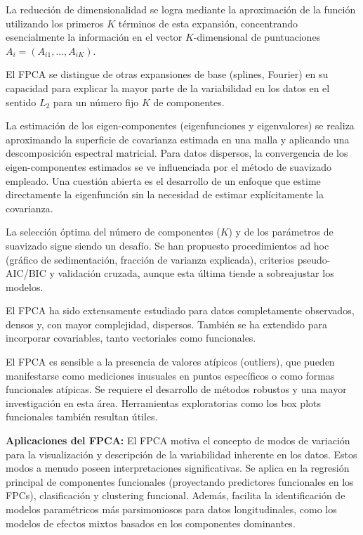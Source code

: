 \documentclass{article}
\begin{document}
\vspace{0.35cm}\noindent
La reducción de dimensionalidad se logra mediante la aproximación de la función utilizando los primeros $K$ términos de esta expansión, concentrando esencialmente la información en el vector $K$-dimensional de puntuaciones $A_i = (A_{i1}, ..., A_{iK})$.

\vspace{0.35cm}\noindent
El FPCA se distingue de otras expansiones de base (splines, Fourier) en su capacidad para explicar la mayor parte de la variabilidad en los datos en el sentido $L_2$ para un número fijo $K$ de componentes.

\vspace{0.35cm}\noindent
La estimación de los eigen-componentes (eigenfunciones y eigenvalores) se realiza aproximando la superficie de covarianza estimada en una malla y aplicando una descomposición espectral matricial. Para datos dispersos, la convergencia de los eigen-componentes estimados se ve influenciada por el método de suavizado empleado. Una cuestión abierta es el desarrollo de un enfoque que estime directamente la eigenfunción sin la necesidad de estimar explícitamente la covarianza.

\vspace{0.35cm}\noindent
La selección óptima del número de componentes ($K$) y de los parámetros de suavizado sigue siendo un desafío. Se han propuesto procedimientos ad hoc (gráfico de sedimentación, fracción de varianza explicada), criterios pseudo-AIC/BIC y validación cruzada, aunque esta última tiende a sobreajustar los modelos.

\vspace{0.35cm}\noindent
El FPCA ha sido extensamente estudiado para datos completamente observados, densos y, con mayor complejidad, dispersos. También se ha extendido para incorporar covariables, tanto vectoriales como funcionales.

\vspace{0.35cm}\noindent
El FPCA es sensible a la presencia de valores atípicos (outliers), que pueden manifestarse como mediciones inusuales en puntos específicos o como formas funcionales atípicas. Se requiere el desarrollo de métodos robustos y una mayor investigación en esta área. Herramientas exploratorias como los box plots funcionales también resultan útiles.

\vspace{0.35cm}\noindent
\textbf{Aplicaciones del FPCA:} El FPCA motiva el concepto de modos de variación para la visualización y descripción de la variabilidad inherente en los datos. Estos modos a menudo poseen interpretaciones significativas. Se aplica en la regresión principal de componentes funcionales (proyectando predictores funcionales en los FPCs), clasificación y clustering funcional. Además, facilita la identificación de modelos paramétricos más parsimoniosos para datos longitudinales, como los modelos de efectos mixtos basados en los componentes dominantes.
\end{document}
